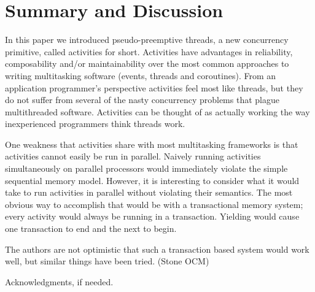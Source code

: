 \documentclass[10pt,preprint]{sigplanconf}
\begin{document}
\section{Summary and Discussion}

In this paper we introduced pseudo-preemptive threads, a new concurrency primitive, called activities for short.
Activities have advantages in reliability, composability and/or maintainability over the most common approaches to writing multitasking software (events, threads and coroutines).
From an application programmer's perspective activities feel most like threads, but they do not suffer from several of the nasty concurrency problems that plague multithreaded software.
Activities can be thought of as actually working the way inexperienced programmers think threads work.

One weakness that activities share with most multitasking frameworks is that activities cannot easily be run in parallel.
Naively running activities simultaneously on parallel processors would immediately violate the simple sequential memory model.
However, it is interesting to consider what it would take to run activities in parallel without violating their semantics.
The most obvious way to accomplish that would be with a transactional memory system; every activity would always be running in a transaction.
Yielding would cause one transaction to end and the next to begin.

The authors are not optimistic that such a transaction based system would work well, but similar things have been tried. (Stone OCM)

\cite{ONeill2015}

\cite{Boussinot2006} %
\cite{Dabrowski2006} %


\acks

Acknowledgments, if needed.








\end{document}
